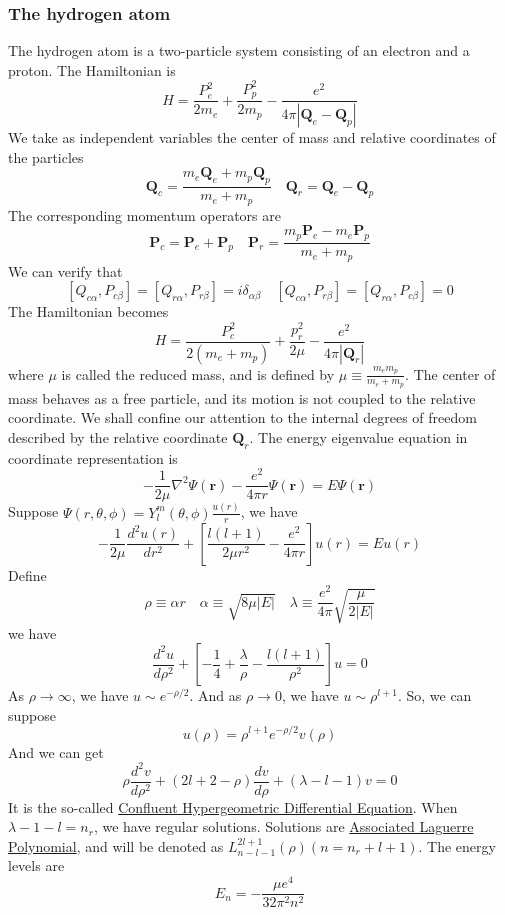 \subsubsection{The hydrogen atom}
The hydrogen atom is a two-particle system consisting of an electron and a proton. The Hamiltonian is
\[H = \frac{P_e^2}{2m_e} + \frac{P_p^2}{2m_p} - \frac{e^2}{4\pi|\bm{Q}_e-\bm{Q}_p|}\]
We take as independent variables the center of mass and relative coordinates of the particles
\[\bm{Q}_c = \frac{m_e\bm{Q}_e + m_p\bm{Q}_p}{m_e+m_p} \quad \bm{Q}_r = \bm{Q}_e-\bm{Q}_p\]
The corresponding momentum operators are
\[\bm{P}_c = \bm{P}_e + \bm{P}_p \quad \bm{P}_r = \frac{m_p\bm{P}_e-m_e\bm{P}_p}{m_e + m_p}\]
We can verify that
\[[Q_{c\alpha},P_{c\beta}] = [Q_{r\alpha},P_{r\beta}] = i\delta_{\alpha\beta} \quad [Q_{c\alpha},P_{r\beta}] = [Q_{r\alpha},P_{c\beta}] = 0\]
The Hamiltonian becomes
\[H = \frac{P_c^2}{2(m_e+m_p)} + \frac{p_r^2}{2\mu} - \frac{e^2}{4\pi|\bm{Q}_r|}\]
where $\mu$ is called the reduced mass, and is defined by $\mu \equiv \frac{m_em_p}{m_e+m_p}$.
The center of mass behaves as a free particle, and its
motion is not coupled to the relative coordinate. We shall confine our attention to the internal degrees of freedom described by the relative coordinate $\bm{Q}_r$. The energy eigenvalue equation in coordinate representation is
\[-\frac{1}{2\mu}\nabla^2 \Psi(\bm{r})  -\frac{e^2}{4\pi r} \Psi(\bm{r}) = E\Psi(\bm{r})\]
Suppose $\Psi(r,\theta,\phi) = Y_l^m(\theta,\phi) \frac{u(r)}{r}$, we have
\[-\frac{1}{2\mu} \frac{d^2 u(r)}{dr^2} + \left[ \frac{l(l+1)}{2\mu r^2} - \frac{e^2}{4\pi r}\right]u(r) = Eu(r)\]
Define
\[\rho \equiv \alpha r \quad \alpha \equiv \sqrt{8\mu|E|} \quad \lambda \equiv \frac{e^2}{4\pi} \sqrt{\frac{\mu}{2|E|}}\]
we have
\[\frac{d^2 u}{d\rho^2} + \left[ -\frac{1}{4} + \frac{\lambda}{\rho} - \frac{l(l+1)}{\rho^2} \right] u = 0\]
As $\rho \to \infty$, we have $u \sim e^{-\rho/2}$. And as $\rho \to 0$, we have $u \sim \rho^{l+1}$. So, we can suppose
\[u(\rho) = \rho^{l+1} e^{-\rho/2} v(\rho)\]
And we can get
\[\rho \frac{d^2 v}{d\rho^2} + (2l+2-\rho)\frac{dv}{d\rho} + (\lambda-l-1)v = 0\]
It is the so-called \href{http://mathworld.wolfram.com/ConfluentHypergeometricDifferentialEquation.html}{Confluent Hypergeometric Differential Equation}.
When $\lambda - 1- l = n_r$, we have regular solutions. Solutions are \href{https://en.wikipedia.org/wiki/Laguerre_polynomials#Generalized_Laguerre_polynomials}{Associated Laguerre Polynomial}, and will be denoted as $L_{n-l-1}^{2l+1}(\rho) (n=n_r+l+1)$. The energy levels are
\[E_n = -\frac{\mu e^4}{32\pi^2 n^2}\]
